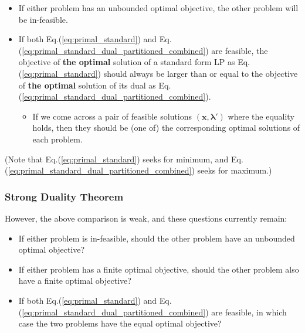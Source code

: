 \documentclass[twocolumn]{ctexart}
\begin{document}
\begin{itemize}
    \item
    If either problem has an unbounded optimal objective,
    the other problem will be in-feasible.
    \item
    If both Eq.(\ref{eq:primal_standard}) and Eq.(\ref{eq:primal_standard_dual_partitioned_combined}) are feasible,
    the objective of \textbf{the optimal} solution of a standard form LP as Eq.(\ref{eq:primal_standard})
    should always be larger than or equal to
    the objective of \textbf{the optimal} solution of its dual as Eq.(\ref{eq:primal_standard_dual_partitioned_combined}).
    \begin{itemize}
        \item
        If we come across a pair of feasible solutions $(\mathbf{x}, \mathbf{\lambda}')$ where the equality holds,
        then they should be (one of) the corresponding optimal solutions of each problem.
    \end{itemize}
\end{itemize}
(Note that Eq.(\ref{eq:primal_standard}) seeks for minimum, and Eq.(\ref{eq:primal_standard_dual_partitioned_combined}) seeks for maximum.)



\subsubsection{Strong Duality Theorem}

However,
the above comparison is weak, and
these questions currently remain:
\begin{itemize}
    \item
    If either problem is in-feasible,
    should the other problem have an unbounded optimal objective?
    \item
    If either problem has a finite optimal objective,
    should the other problem also have a finite optimal objective?
    \item
    If both Eq.(\ref{eq:primal_standard}) and Eq.(\ref{eq:primal_standard_dual_partitioned_combined}) are feasible,
    in which case the two problems have the equal optimal objective?
\end{itemize}
\end{document}
